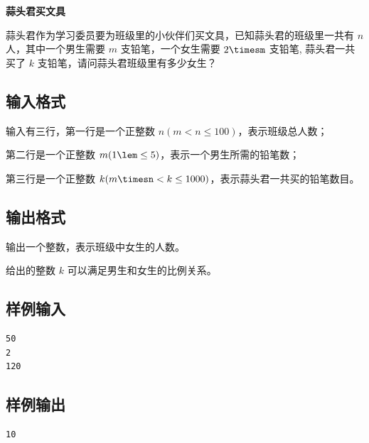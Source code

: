 \documentclass{article}
\newcommand{\problemname}[1]{\begin{center}\Large\bfseries #1\end{center}}
\begin{document}
\problemname{蒜头君买文具}

蒜头君作为学习委员要为班级里的小伙伴们买文具，已知蒜头君的班级里一共有 $n$ 人，其中一个男生需要 $m$ 支铅笔，一个女生需要 $2\timesm$ 支铅笔, 蒜头君一共买了 $k$ 支铅笔，请问蒜头君班级里有多少女生？

\subsection*{输入格式}
输入有三行，第一行是一个正整数 $n(m<n\le100)$，表示班级总人数；

第二行是一个正整数 $m(1\lem\le5)$，表示一个男生所需的铅笔数；

第三行是一个正整数 $k(m\timesn<k\le1000)$，表示蒜头君一共买的铅笔数目。

\subsection*{输出格式}
输出一个整数，表示班级中女生的人数。

给出的整数 $k$ 可以满足男生和女生的比例关系。

\subsection*{样例输入}
\begin{verbatim}
50
2
120
\end{verbatim}

\subsection*{样例输出}
\begin{verbatim}
10
\end{verbatim}
\end{document}
